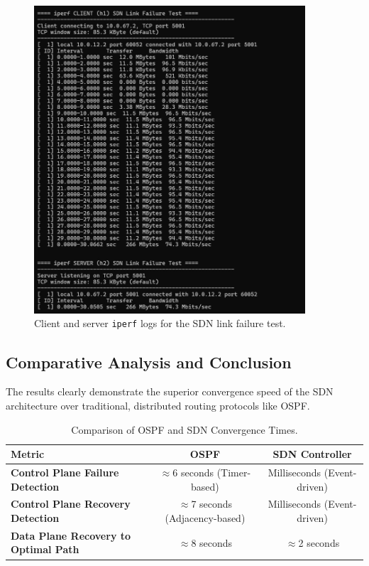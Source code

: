\documentclass[12pt]{article}
\begin{document}
\begin{figure}[h!]
    \centering
    \includegraphics[width=0.9\textwidth]{p4_link_failure_server_sdn.jpeg}
    \caption{Client and server \texttt{iperf} logs for the SDN link failure test.}
    \label{fig:sdn_link_failure_logs}
\end{figure}


\subsection{Comparative Analysis and Conclusion}
The results clearly demonstrate the superior convergence speed of the SDN architecture over traditional, distributed routing protocols like OSPF.

\begin{table}[h!]
\centering
\begin{tabular}{|l|c|c|}
\hline
\textbf{Metric} & \textbf{OSPF} & \textbf{SDN Controller} \\ \hline
\textbf{Control Plane Failure Detection} & $\approx$6 seconds (Timer-based) & Milliseconds (Event-driven) \\ \hline
\textbf{Control Plane Recovery Detection} & $\approx$7 seconds (Adjacency-based) & Milliseconds (Event-driven) \\ \hline
\textbf{Data Plane Recovery to Optimal Path} & $\approx$8 seconds & $\approx$2 seconds \\ \hline
\end{tabular}
\caption{Comparison of OSPF and SDN Convergence Times.}
\label{tab:comparison}
\end{table}
\end{document}
